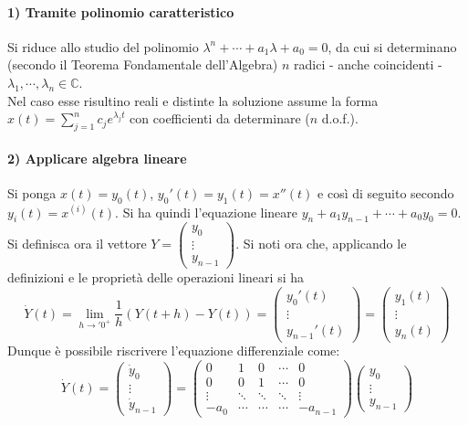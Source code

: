 \documentclass[10pt]{article}
\theoremstyle{plain}
\begin{document}
\paragraph{1) Tramite polinomio caratteristico}
Si riduce allo studio del polinomio $\lambda^n + \cdots + a_1\lambda + a_0 = 0$, da cui si determinano (secondo il Teorema Fondamentale dell'Algebra) $n$ radici - anche coincidenti - $\lambda_1, \cdots, \lambda_n \in \mathbb{C}$.
\\Nel caso esse risultino reali e distinte la soluzione assume la forma $\displaystyle x(t) = \sum\limits_{j=1}^n c_j e^{\lambda_j t}$ con coefficienti da determinare ($n$ d.o.f.).

\paragraph{2) Applicare algebra lineare}
Si ponga $x(t) = y_0(t)$, $y_0'(t) = y_1(t) = x''(t)$ e così di seguito secondo $y_i(t) = x^{(i)}(t)$. Si ha quindi l'equazione lineare $y_n + a_1 y_{n-1} + \cdots + a_0 y_0 = 0$.
\\Si definisca ora il vettore $\displaystyle Y = \begin{pmatrix} 
y_0\\ \vdots \\y_{n-1}
\end{pmatrix}$. Si noti ora che, applicando le definizioni e le proprietà delle operazioni lineari si ha 
\[\dot{Y}(t) = \lim\limits_{h \rightarrow '0^+} \frac{1}{h}(Y(t+h) - Y(t)) = \begin{pmatrix}
    y_0'(t)\\ \vdots \\ y_{n-1}'(t)
\end{pmatrix} = \begin{pmatrix}
    y_1(t) \\ \vdots \\ y_n(t)
\end{pmatrix}\]
Dunque è possibile riscrivere l'equazione differenziale come:
\[\dot{Y}(t) = \begin{pmatrix}
        \dot{y}_0\\ \vdots \\ \dot{y}_{n-1}
\end{pmatrix} = \begin{pmatrix}
    0 & 1 & 0 & \cdots & 0\\
    0 & 0 & 1 & \cdots & 0\\
    \vdots & \ddots & \ddots & \ddots & \vdots\\
    -a_0 & \cdots & \cdots & \cdots & - a_{n-1}
\end{pmatrix} \begin{pmatrix}
    y_0\\ \vdots \\ y_{n-1}
\end{pmatrix}\]
\end{document}
